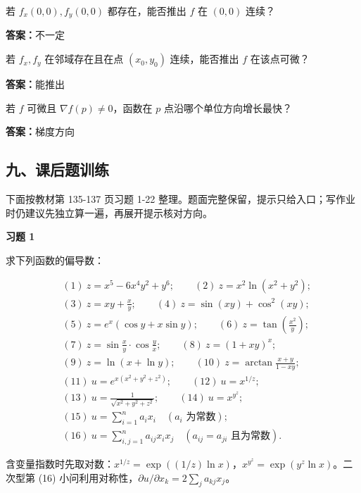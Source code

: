 \begin{quickcheck}
若 \(f_x(0,0),f_y(0,0)\) 都存在，能否推出 \(f\) 在 \((0,0)\) 连续？

\tcblower
\textbf{答案：}不一定
\end{quickcheck}

\begin{quickcheck}
若 \(f_x,f_y\) 在邻域存在且在点 \((x_0,y_0)\) 连续，能否推出 \(f\) 在该点可微？

\tcblower
\textbf{答案：}能推出
\end{quickcheck}

\begin{quickcheck}
若 \(f\) 可微且 \(\nabla f(p)\ne0\)，函数在 \(p\) 点沿哪个单位方向增长最快？

\tcblower
\textbf{答案：}梯度方向
\end{quickcheck}

\subsection*{九、课后题训练}

下面按教材第 135-137 页习题 1-22 整理。题面完整保留，提示只给入口；写作业时仍建议先独立算一遍，再展开提示核对方向。

\begin{exercisebox}
\textbf{习题 1}

求下列函数的偏导数：

\[
      \begin{aligned}
      &(1)\ z=x^5-6x^4y^2+y^6; \qquad
      (2)\ z=x^2\ln(x^2+y^2);\\
      &(3)\ z=xy+\frac{x}{y}; \qquad
      (4)\ z=\sin(xy)+\cos^2(xy);\\
      &(5)\ z=e^x(\cos y+x\sin y); \qquad
      (6)\ z=\tan\left(\frac{x^2}{y}\right);\\
      &(7)\ z=\sin\frac{x}{y}\cdot\cos\frac{y}{x}; \qquad
      (8)\ z=(1+xy)^x;\\
      &(9)\ z=\ln(x+\ln y); \qquad
      (10)\ z=\arctan\frac{x+y}{1-xy};\\
      &(11)\ u=e^{x(x^2+y^2+z^2)}; \qquad
      (12)\ u=x^{1/z};\\
      &(13)\ u=\frac1{\sqrt{x^2+y^2+z^2}}; \qquad
      (14)\ u=x^{y^z};\\
      &(15)\ u=\sum_{i=1}^n a_i x_i\quad (a_i\text{ 为常数});\\
      &(16)\ u=\sum_{i,j=1}^n a_{ij}x_i x_j\quad (a_{ij}=a_{ji}\text{ 且为常数}).
      \end{aligned}
      \]

\begin{hintbox}
含变量指数时先取对数：\(x^{1/z}=\exp((1/z)\ln x)\)，\(x^{y^z}=\exp(y^z\ln x)\)。二次型第 (16) 小问利用对称性，\(\partial u/\partial x_k=2\sum_j a_{kj}x_j\)。
\end{hintbox}
\end{exercisebox}

